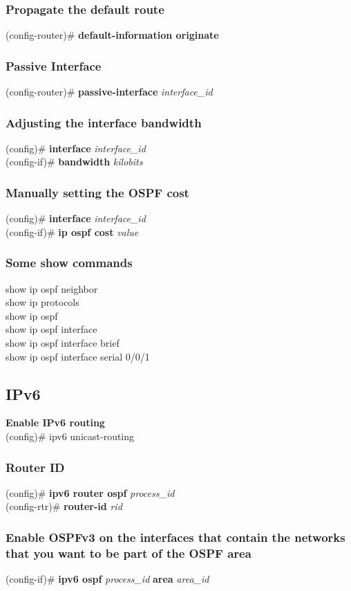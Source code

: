 \subsubsection*{Propagate the default route}
(config-router)\# \textbf{default-information originate}
\subsubsection*{Passive Interface}
(config-router)\#\textbf{ passive-interface} \textit{interface\_id}
\subsubsection*{Adjusting the interface bandwidth}
(config)\# \textbf{interface} \textit{interface\_id}\\
(config-if)\# \textbf{bandwidth} \textit{kilobits}
\subsubsection*{Manually setting the OSPF cost}
(config)\# \textbf{interface} \textit{interface\_id}\\
(config-if)\# \textbf{ip ospf cost} \textit{value}
\subsubsection*{Some show commands}
show ip ospf neighbor\\
show ip protocols\\
show ip ospf\\
show ip ospf interface\\
show ip ospf interface brief\\
show ip ospf interface serial 0/0/1

\subsection{IPv6}
\textrm{\textbf{Enable IPv6 routing}}\\
(config)\# ipv6 unicast-routing
\subsubsection*{Router ID}
(config)\# \textbf{ipv6 router ospf} \textit{process\_id}\\
(config-rtr)\# \textbf{router-id} \textit{rid}
\subsubsection*{Enable OSPFv3 on the interfaces that contain the networks that you want to be part of the OSPF area}
(config-if)\# \textbf{ipv6 ospf} \textit{process\_id} \textbf{area} \textit{area\_id}
